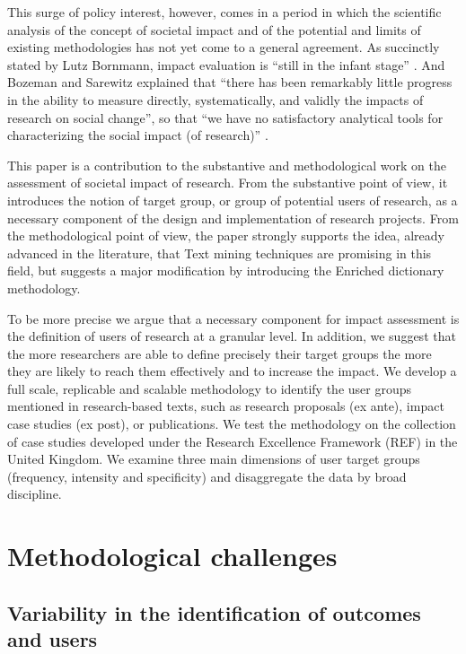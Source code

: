 \documentclass[]{book}
\begin{document}
This surge of policy interest, however, comes in a period in which the
scientific analysis of the concept of societal impact and of the
potential and limits of existing methodologies has not yet come to a
general agreement. As succinctly stated by Lutz Bornmann, impact
evaluation is ``still in the infant stage''
\citep{bornmann2013societal}. And Bozeman and Sarewitz
\citep{bozeman2011public} explained that ``there has been remarkably
little progress in the ability to measure directly, systematically, and
validly the impacts of research on social change'', so that ``we have no
satisfactory analytical tools for characterizing the social impact (of
research)'' \citep{bozeman2011public}.

This paper is a contribution to the substantive and methodological work
on the assessment of societal impact of research. From the substantive
point of view, it introduces the notion of target group, or group of
potential users of research, as a necessary component of the design and
implementation of research projects. From the methodological point of
view, the paper strongly supports the idea, already advanced in the
literature, that Text mining techniques are promising in this field, but
suggests a major modification by introducing the Enriched dictionary
methodology.

To be more precise we argue that a necessary component for impact
assessment is the definition of users of research at a granular level.
In addition, we suggest that the more researchers are able to define
precisely their target groups the more they are likely to reach them
effectively and to increase the impact. We develop a full scale,
replicable and scalable methodology to identify the user groups
mentioned in research-based texts, such as research proposals (ex ante),
impact case studies (ex post), or publications. We test the methodology
on the collection of case studies developed under the Research
Excellence Framework (REF) in the United Kingdom. We examine three main
dimensions of user target groups (frequency, intensity and specificity)
and disaggregate the data by broad discipline.

\section{Methodological challenges}\label{methodological-challenges}

\subsection{Variability in the identification of outcomes and
users}\label{variability-in-the-identification-of-outcomes-and-users}
\end{document}
